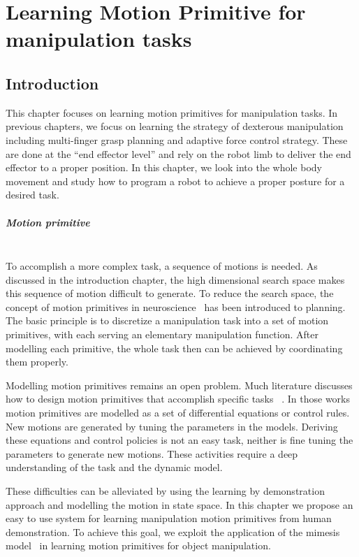 \chapter{Learning Motion Primitive for manipulation tasks}
\label{cha5}

\section{Introduction}
\label{cha5:sec1}
This chapter focuses on learning motion primitives for manipulation tasks. In previous chapters, we focus on learning the strategy of dexterous manipulation including multi-finger grasp planning and adaptive force control strategy. These are done at the ``end effector level'' and rely on the robot limb to deliver the end effector to a proper position. In this chapter, we look into the whole body movement and study how to program a robot to achieve a proper posture for a desired task.

\paragraph{Motion primitive} ~\\
To accomplish a more complex task, a sequence of motions is needed. As discussed in the introduction chapter, the high dimensional search space makes this sequence of motion difficult to generate. To reduce the search space, the concept of motion primitives in neuroscience~\citep{bizzi2008combining} has been introduced to planning. The basic principle is to discretize a manipulation task into a set of motion primitives, with each serving an elementary manipulation function. After modelling each primitive, the whole task then can be achieved by coordinating them properly.

Modelling motion primitives remains an open problem. Much literature discusses how to design motion primitives that accomplish specific tasks ~\citep{michelman1994forming,felip2012manipulation,ijspeert2013dynamical}. In those works motion primitives are modelled as a set of differential equations or control rules. New motions are generated by tuning the parameters in the models. Deriving these equations and control policies is not an easy task, neither is fine tuning the parameters to generate new motions. These activities require a deep understanding of the task and the dynamic model. 

These difficulties can be alleviated by using the learning by demonstration approach and modelling the motion in state space. In this chapter we propose an easy to use system for learning manipulation motion primitives from human demonstration. To achieve this goal, we exploit the application of the mimesis model~\citep{inamura2004embodied} in learning motion primitives for object manipulation.

